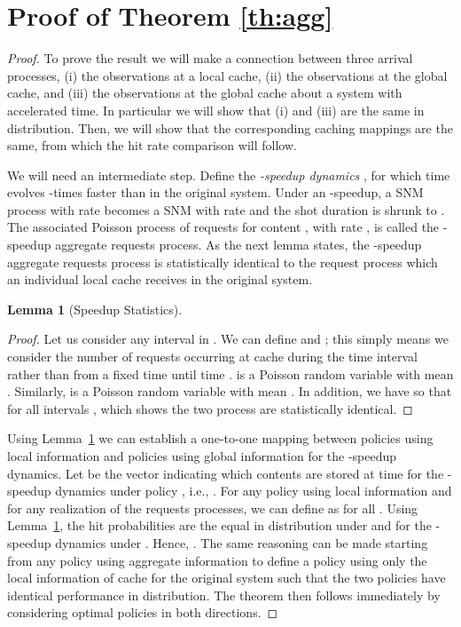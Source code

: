 \documentclass[10pt, conference, letterpaper]{IEEEtran}
\newtheorem{lemma}[theorem]{Lemma}
\begin{document}
\section{Proof of Theorem \ref{th:agg}}\label{app:b}
\begin{proof}
 To prove the result we will make a connection between three arrival processes, (i) the observations at a local cache, (ii) the observations at the global cache, and (iii) the observations at the global cache about a system with accelerated time. In particular we will show that (i) and (iii) are the same in distribution. Then, we will show that the corresponding caching mappings are the same, from which the hit rate comparison will follow.

We will need an intermediate step. Define the \emph{-speedup dynamics} , for which time evolves -times faster than in the original system.
Under an -speedup, a SNM process with rate  becomes a SNM with rate  and the shot duration is shrunk to . The associated Poisson process  of requests for content , with rate , is called the -speedup aggregate requests process. As the next lemma states, the -speedup aggregate requests process is statistically identical to the request process which an individual local cache receives in the original system.
\begin{lemma}[Speedup Statistics]\label{lem:agg}

\end{lemma}
\begin{proof}
Let us consider any interval  in . We can define  and ; this simply means we consider the number of requests occurring at cache  during the time interval  rather than from a fixed time until time .  is a Poisson random variable with mean . Similarly,  is a Poisson random variable with mean . In addition, we have  so that  for all intervals , which shows the two process are statistically identical.
\end{proof}
Using Lemma~\ref{lem:agg} we can establish a one-to-one mapping between policies  using local information and policies  using global information for the -speedup dynamics. Let  be the vector indicating which contents are stored at time  for the -speedup dynamics under policy , i.e., . For any policy  using local information and for any realization of the requests processes, we can define  as  for all . Using Lemma~\ref{lem:agg}, the hit probabilities are the equal in distribution under  and for the -speedup dynamics under . Hence, . The same reasoning can be made starting from any policy  using aggregate information to define a policy  using only the local information of cache  for the original system such that the two policies have identical performance in distribution. The theorem then follows immediately by considering optimal policies in both directions.
\end{proof}
\end{document}
